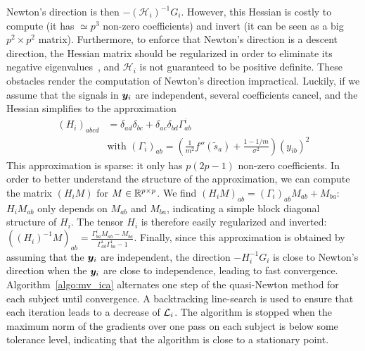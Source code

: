 Newton's direction is then $-\left(\mathcal{H}_i\right)^{-1}G_i$. However, this Hessian is costly to compute (it has $\simeq p^3$ non-zero coefficients) and invert (it can be seen as a big $p ^2\times p^2$ matrix). Furthermore, to enforce that Newton's direction is a descent direction, the Hessian matrix should be regularized in order to eliminate its negative eigenvalues~\cite{nocedal2006numerical}, and $\mathcal{H}_i$ is not guaranteed to be positive definite.
%
These obstacles render the computation of Newton's direction impractical.
%
Luckily, if we assume that the signals in $\boldsymbol{y}_i$ are independent, several coefficients cancel, and the Hessian simplifies to the approximation
\begin{align}
    \label{eq:hessian_approx}
    (H_i)_{abcd} &= \delta_{ad}\delta_{bc} + \delta_{ac}\delta_{bd}\Gamma^i_{ab} \\
    &\text{with  }(\Gamma_i)_{ab} = \left(\frac{1}{m^2}f''(\tilde{s}_a) + \frac{1 - 1/m}{\sigma^2}\right)\left(y_{ib}\right)^2 \nonumber
\end{align}
This approximation is sparse: it only has $p(2p -1)$ non-zero coefficients.
%
In order to better understand the structure of the approximation, we can compute the matrix $\left(H_iM\right)$ for $M\in \mathbb{R}^{p\times p}$. 
%
We find $\left(H_iM\right)_{ab} = (\Gamma_i)_{ab}M_{ab} + M_{ba}$: $H_iM_{ab}$ only depends on $M_{ab}$ and $M_{ba}$, indicating a simple block diagonal structure of $H_i$.
%
The tensor $H_i$ is therefore easily regularized and inverted:
$\left((H_i)^{-1}M\right)_{ab} = \frac{\Gamma^i_{ba}M_{ab} - M_{ba}}{\Gamma^i_{ab}\Gamma^i_{ba} - 1}$.
%
Finally, since this approximation is obtained by assuming that the $\boldsymbol{y}_i$ are independent, the direction $-H_i^{-1}G_i$ is close to Newton's direction when the $\boldsymbol{y}_i$ are close to independence, leading to fast convergence.
%
Algorithm~\ref{algo:mv_ica} alternates one step of the quasi-Newton method for each subject until convergence.
%
A backtracking line-search is used to ensure that each iteration leads to a decrease of $\mathcal{L}_i$.
%
The algorithm is stopped when the maximum norm of the gradients over one pass on each subject is below some tolerance level, indicating that the algorithm is close to a stationary point.

